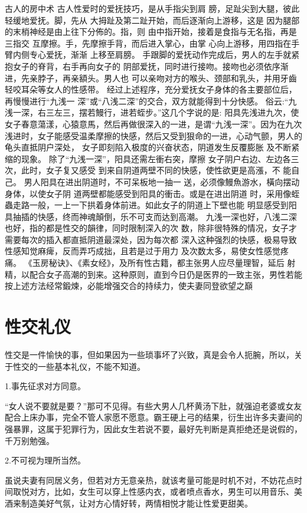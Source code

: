 \documentclass[12pt,UTF8]{ctexbook}
\begin{document}
古人的房中术
古人性爱时的爱抚技巧，是从手指尖到肩
膀，足趾尖到大腿，彼此轻缓地爱抚。脚，先从
大拇趾及第二趾开始，而后逐渐向上游移，这是
因为腿部的末梢神经是由上往下分佈的。指，则
由中指开始，接着是食指与无名指，再是三指交
互摩擦。手，先摩擦手背，而后进入掌心，由掌
心向上游移，用四指在手臂内侧专心爱抚，渐渐
上移至肩膀。
手跟脚的爱抚动作完成后，男人的左手就紧抱女子的脊背，右手再向女子的
阴部爱抚，同时进行接吻。接吻也必须依序渐进，先亲脖子，再亲額头。男人也
可以亲吻对方的喉头、颈部和乳头，并用牙齒轻咬耳朵等女人的性感带。
经过上述程序，充分爱抚女子身体的各主要部位后，再慢慢进行“九浅一
深”或“八浅二深”的交合，双方就能得到十分快感。
俗云:“九浅一深，右三左三，摆若鰻行，进若蛭步。”这几个字说的是:
阳具先浅进九次，使女子春意蕩漾，心猿意馬，然后再做很深入的一进，是谓“九浅一深”。因为在九次浅进时，女子能感受温柔摩擦的快感，然后又受到狠命的一进，心动气颤，男人的龟头直抵阴户深处，
女子即刻陷入极度的兴奋状态，阴道发生反覆膨胀
及不断紧缩的现象。
除了“九浅一深”，阳具还需左衝右突，摩擦
女子阴户右边、左边各三次，此时，女子复又感受
到来自阴道两壁不同的快感，使性欲更是高漲，不
能自己。
男人阳具在进出阴道时，不可呆板地一抽一
送，必须像鰻魚游水，橫向摆动身体，以使女子阴
道两壁都能感受到阳具的衝击。或是在进出阴道
时，采用像蛭蟲走路一般，一上一下拱着身体前进。如此女子的阴道上下壁也能
明显感受到阳具抽插的快感，终而神魂顛倒，乐不可支而达到高潮。
九浅一深也好，八浅二深也好，指的都是性交的韻律，同时限制深入的次
数，除非很特殊的情况，女子才需要每次的插入都直抵阴道最深处，因为每次都
深入这种强烈的快感，极易导致性感知觉麻痺，反而弄巧成拙，且若是过于用力
及次数太多，易使女性感觉疼痛。
《玉房秘诀》、《素女经》，及所有性古籍，都主张男人应尽量理智，延后
射精，以配合女子高潮的到来。这种原则，直到今日仍是医界的一致主张，男性若能按上述方法经常鍛煉，必能增强交合的持续力，使夫妻同登欲望之巔

\chapter{性交礼仪}

性交是一件愉快的事，但如果因为一些琐事坏了兴致，真是会令人扼腕，所以，关于性交的一些基本礼仪，不能不知道。

1.事先征求对方同意。

“女人说不要就是要？”那可不见得。有些大男人几杯黄汤下肚，就强迫老婆或女友配合上床办事，完全不管人家愿不愿意。霸王硬上弓的结果，衍生出许多夫妻间的强暴罪，这属于犯罪行为，因此女生若说不要，最好先判断是真拒绝还是说假的，千万别勉强。

2.不可视为理所当然。

虽说夫妻有同居义务，但若对方无意亲热，就该考量可能是时机不对，不妨花点时间取悦对方，比如，女生可以穿上性感内衣，或者喷点香水，男生可以用音乐、美酒来制造美好气氛，让对方心情好转，两情相悦才能让性爱更甜美。
\end{document}
